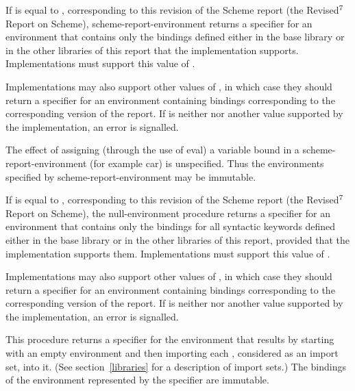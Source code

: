 \begin{entry}{%
}
\label{environments}

If  is equal to {\cf \integerversion},
corresponding to this revision of the Scheme report (the
Revised$^7$ Report on Scheme),
{\cf scheme-report-environment} returns a specifier for an
environment that contains only the bindings
defined either in the base library or in the other libraries
of this report that the implementation supports.
Implementations must support this value of .

Implementations may also support other values of , in which
case they should return a specifier for an environment containing bindings corresponding to the corresponding version of the report.
If 
is neither {\cf \integerversion} nor another value supported by
the implementation, an error is signalled.

The effect of assigning (through the use of {\cf eval}) a variable
bound in a {\cf scheme-report-environment}
(for example {\cf car}) is unspecified.  Thus the environments specified
by {\cf scheme-report-environment} may be immutable.

\end{entry}

\begin{entry}{%
}

If  is equal to {\cf \integerversion},
corresponding to this revision of the Scheme report (the
Revised$^7$ Report on Scheme),
the {\cf null-environment} procedure returns
a specifier for an environment that contains only the
bindings for all syntactic keywords
defined either in the base library or in the other libraries
of this report, provided that the implementation supports them.
Implementations must support this value of .

Implementations may also support other values of , in which
case they should return a specifier for an environment containing bindings corresponding to the corresponding version of the report.
If 
is neither {\cf \integerversion} nor another value supported by
the implementation, an error is signalled.

\end{entry}

\begin{entry}{%
}

This procedure returns a specifier for the environment that results by
starting with an empty environment and then importing each ,
considered as an import set, into it.  (See section~\ref{libraries} for
a description of import sets.)  The bindings of the environment
represented by the specifier are immutable.

\end{entry}

